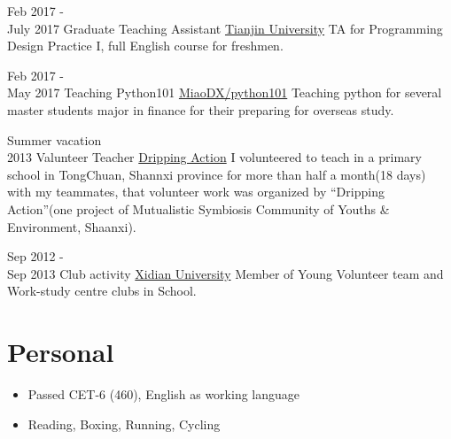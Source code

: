 \documentclass[letterpaper]{twentysecondcv} %
\begin{document}
\begin{twenty}

\twentyitem
    {Feb 2017 - \\ July 2017}
    {Graduate Teaching Assistant}
    {\href{http://tju.edu.cn/}{Tianjin University}}
    {}
    {TA for Programming Design Practice I, full English course for freshmen.}    

\twentyitem
    {Feb 2017 - \\ May 2017}
    {Teaching Python101}
    {\href{https://github.com/MiaoDX/python101}{MiaoDX/python101}}
    {}
    {Teaching python for several master students major in finance for their preparing for overseas study.}    

\twentyitem
    {Summer vacation \\ 2013}
    {Valunteer Teacher}
    {\href{http://blog.sina.com.cn/xiaanedu}{Dripping Action}}
    {}
    {I volunteered to teach in a primary school in TongChuan, Shannxi province for more than half a month(18 days) with my teammates, that volunteer work was organized by “Dripping Action”(one project of Mutualistic Symbiosis Community of Youths \& Environment, Shaanxi).
    }


\twentyitem
    {Sep 2012 - \\ Sep 2013}
    {Club activity}
    {\href{http://www.xidian.edu.cn/}{Xidian University}}
    {}
    {Member of Young Volunteer team and Work-study centre clubs in
School.}    


    
    
\end{twenty}

\section{Personal}

\begin{twenty} %
    
\twentyitem
    {}
    {}
    {}
    {}
    {        
        {\begin{itemize}
            \item Passed CET-6 (460), English as working language
            \item Reading, Boxing, Running, Cycling
        \end{itemize}
         }
    }    
        
\end{twenty}
\end{document}
